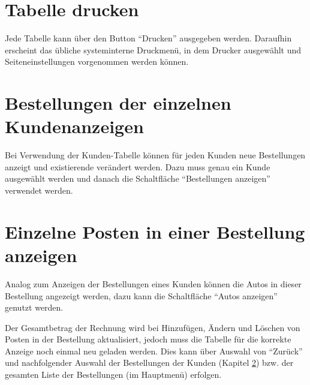 	\section{Tabelle drucken}
		Jede Tabelle kann über den Button "`Drucken"' ausgegeben werden.
		Daraufhin erscheint das übliche systeminterne Druckmenü, in dem Drucker
		ausgewählt und Seiteneinstellungen vorgenommen werden können.
	
	\section{Bestellungen der einzelnen Kundenanzeigen}\label{bestellungen_anzeigen}
		Bei Verwendung der Kunden-Tabelle können
		für jeden Kunden neue Bestellungen anzeigt und existierende verändert werden.
		Dazu muss genau ein Kunde ausgewählt werden und danach die Schaltfläche
		"`Bestellungen anzeigen"' verwendet werden.
	
	\section{Einzelne Posten in einer Bestellung anzeigen}
		Analog zum Anzeigen der Bestellungen eines Kunden können die Autos in dieser
		Bestellung angezeigt werden, dazu kann die Schaltfläche "`Autos anzeigen"'
		genutzt werden.
		
		Der Gesamtbetrag der Rechnung wird bei Hinzufügen, Ändern und Löschen von
		Posten in der Bestellung aktualisiert, jedoch muss die Tabelle für die
		korrekte Anzeige noch einmal neu geladen werden. Dies kann über Auswahl von
		"`Zurück"' und nachfolgender Auswahl der Bestellungen der Kunden
		(Kapitel \ref{bestellungen_anzeigen}) bzw. der gesamten Liste der Bestellungen
		(im Hauptmenü) erfolgen.
